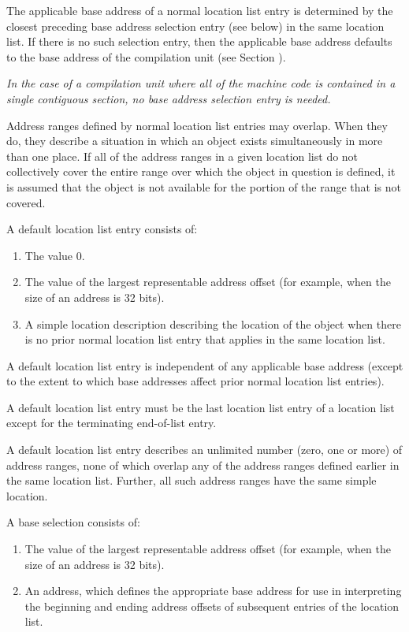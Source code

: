 The applicable base address of a normal
location list entry is
determined by the closest preceding base address selection
entry (see below) in the same location list. If there is
no such selection entry, then the applicable base address
defaults to the base address of the compilation unit (see
Section ).  

\textit{In the case of a compilation unit where all of
the machine code is contained in a single contiguous section,
no base address selection entry is needed.}

Address ranges defined by normal location list entries
may overlap. When they do, they describe a
situation in which an object exists simultaneously in more than
one place. If all of the address ranges in a given location
list do not collectively cover the entire range over which the
object in question is defined, it is assumed that the object is
not available for the portion of the range that is not covered.

A default location list entry consists of:
\begin{enumerate}[1. ]
\item The value 0.
\item The value of the largest representable address offset (for
      example, \wffffffff when the size of an address is 32 bits).
\item A simple location description describing the location of the
      object when there is no prior normal location list entry
      that applies in the same location list.
\end{enumerate}

A default location list entry is independent of any applicable
base address (except to the extent to which base addresses
affect prior normal location list entries).

A default location list entry must be the last location list
entry of a location list except for the terminating end-of-list
entry.

A default location list entry describes an unlimited number
(zero, one or more) of address ranges, none of which overlap
any of the address ranges defined earlier in the same location
list. Further, all such address ranges have the same simple
location.

A base 
selection 
consists of:
\begin{enumerate}[1. ]
\item The value of the largest representable 
address offset (for example, \wffffffff when the size of
an address is 32 bits).
\item An address, which defines the 
appropriate base address for use in interpreting the beginning
and ending address offsets of subsequent entries of the location list.
\end{enumerate}

